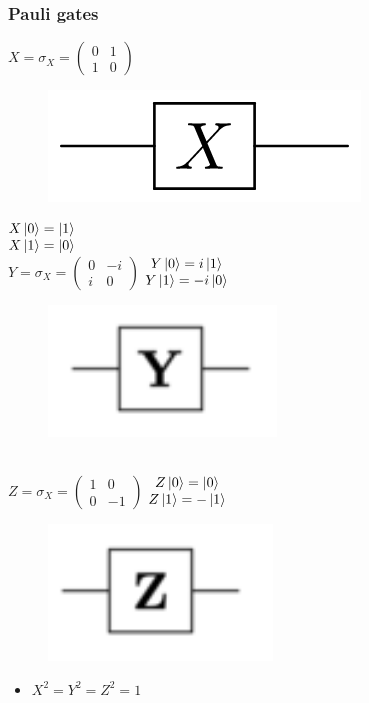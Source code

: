 \documentclass[11.5pt, paper=a4]{article}
\theoremstyle{definition}
\numberwithin{theorem}{section}
\begin{document}
\subsubsection{Pauli gates}
    $X = \sigma_{X} = \begin{pmatrix}
    0 & 1\\
    1 & 0
    \end{pmatrix}$
    \begin{figure}[h]
        \includegraphics[scale=0.15]{images/download.png}
    \end{figure}
    $\begin{matrix}
    X\ket{0} = \ket{1}\\
    X\ket{1} = \ket{0}
    \end{matrix}$ \\ 
    $Y = \sigma_{X} = \begin{pmatrix}
    0 & -i\\
    i & 0
    \end{pmatrix}$ $\begin{matrix}
    Y\ket{0} = i\ket{1}\\
    Y\ket{1} = -i\ket{0}
    \end{matrix}$
    \begin{figure}[h]
        \includegraphics[scale=0.2]{images/Y gate.png}
    \end{figure} \\
    $Z = \sigma_{X} = \begin{pmatrix}
    1 & 0\\
    0 & -1
    \end{pmatrix}$ $\begin{matrix}
    Z\ket{0} = \ket{0}\\
    Z\ket{1} = -\ket{1}
    \end{matrix}$ 
    \begin{figure}[h]
        \includegraphics[scale=0.2]{images/Z gate.png}
    \end{figure} 
    \begin{itemize}
        \item $ X^{2} = Y^{2} = Z^{2} = 1 $
    \end{itemize}
\end{document}
